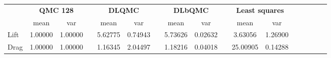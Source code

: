 \begin{tabular}{lcccccccccccccccc}
\toprule
 &\multicolumn{2}{c}{\textbf{QMC 128}}&&\multicolumn{2}{c}{\textbf{DLQMC}}&&\multicolumn{2}{c}{\textbf{DLbQMC}}&&\multicolumn{2}{c}{\textbf{Least squares}}\\ 
\cmidrule(r){2-3} \cmidrule(r){5-6} \cmidrule(r){8-9}
 &mean&var&&mean&var&&mean&var&&mean&var\\ 
\midrule
Lift &1.00000&1.00000&&5.62775&0.74943&&5.73626&0.02632&&3.63056&1.26900\\ 
Drag &1.00000&1.00000&&1.16345&2.04497&&1.18216&0.04018&&25.00905&0.14288\\ 
\bottomrule
\end{tabular}


